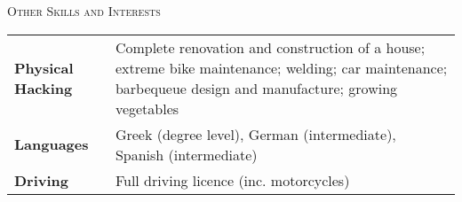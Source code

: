 \documentclass[a4paper,10pt]{article}
\newcommand{\header}[1]{{\hspace*{-17pt}\vspace*{6pt} \large{\textsc{#1}}}}
\begin{document}
\header{Other Skills and Interests}

\begin{tabular}{p{1.8in}p{4.3in}}
\textbf{Physical Hacking} & Complete renovation and construction of a house; extreme bike maintenance; welding; car maintenance; barbequeue design and manufacture; growing vegetables\\
\textbf{Languages} & Greek (degree level), German (intermediate), Spanish (intermediate)\\
\textbf{Driving} & Full driving licence (inc. motorcycles) \\

\end{tabular}
\end{document}

